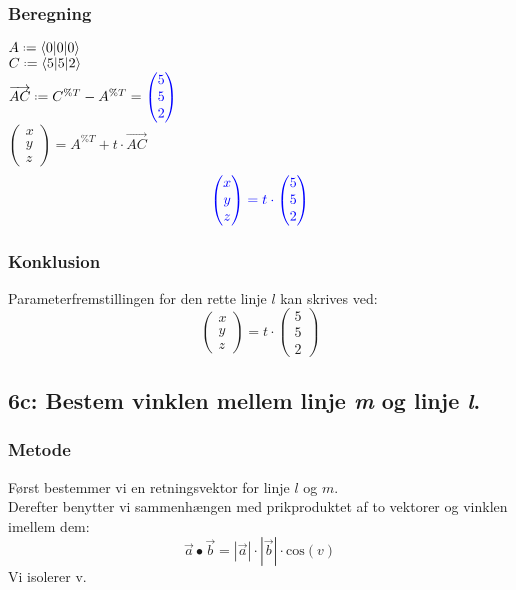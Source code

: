 \documentclass[../main.tex]{subfiles}
\begin{document}
    \subsubsection*{Beregning}
        \(A \defeq \langle 0|0|0 \rangle\)\\
        \(C \defeq \langle 5|5|2 \rangle\)\\
        \(\overrightarrow{AC} \defeq C^{\%T}-A^{\%T} = \textcolor{blue}{\begin{pmatrix}5\\5\\2 \end{pmatrix}}\)\\
        \(\begin{pmatrix}x\\y\\z \end{pmatrix}=A^{\%T} + t\cdot \overrightarrow{AC}\)
        \[\textcolor{blue}{\begin{pmatrix}x\\y\\z \end{pmatrix} = t \cdot \begin{pmatrix}5\\5\\2 \end{pmatrix}}\]
    \subsubsection*{Konklusion}
        Parameterfremstillingen for den rette linje \(l\) kan skrives ved:
        \[\begin{pmatrix}x\\y\\z \end{pmatrix} = t \cdot \begin{pmatrix}5\\5\\2 \end{pmatrix}\]
\clearpage
\subsection*{6c: Bestem vinklen mellem linje \textit{m} og linje \textit{l}.}
    \subsubsection*{Metode}
        Først bestemmer vi en retningsvektor for linje \(l\) og \(m\).\\
        Derefter benytter vi sammenhængen med prikproduktet af to vektorer og vinklen imellem dem:
        \[\overrightarrow{a}\bullet \overrightarrow{b}=\left|\overrightarrow{a}\right|\cdot\left|\overrightarrow{b}\right|\cdot \text{cos}(v)\]
        Vi isolerer v.
\end{document}
